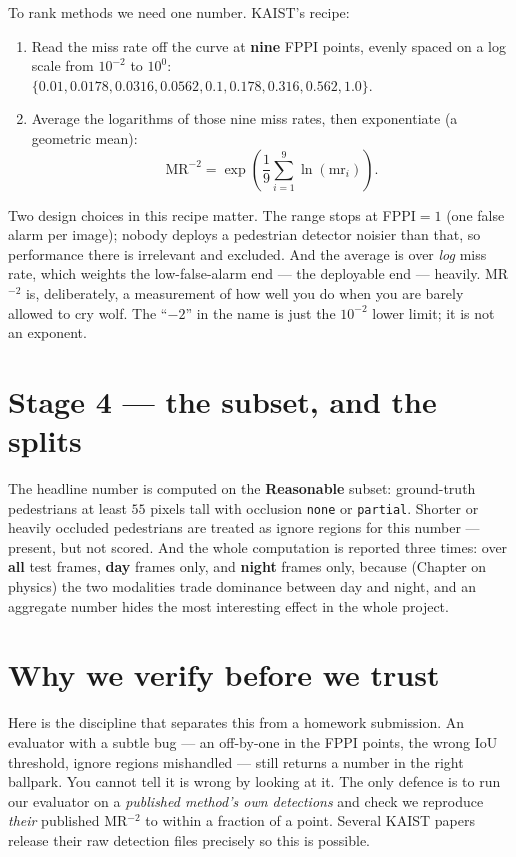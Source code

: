\documentclass[../main.tex]{subfiles}
\begin{document}
To rank methods we need one number. KAIST's recipe:
\begin{enumerate}
  \item Read the miss rate off the curve at \textbf{nine} FPPI points, evenly spaced on a log
        scale from $10^{-2}$ to $10^{0}$:
        $\{0.01, 0.0178, 0.0316, 0.0562, 0.1, 0.178, 0.316, 0.562, 1.0\}$.
  \item Average the logarithms of those nine miss rates, then exponentiate (a geometric mean):
        \[
          \mathrm{MR}^{-2} = \exp\!\left(\frac{1}{9}\sum_{i=1}^{9} \ln(\text{mr}_i)\right).
        \]
\end{enumerate}
Two design choices in this recipe matter. The range stops at FPPI${}=1$ (one false alarm per
image); nobody deploys a pedestrian detector noisier than that, so performance there is
irrelevant and excluded. And the average is over \emph{log} miss rate, which weights the
low-false-alarm end --- the deployable end --- heavily. MR$^{-2}$ is, deliberately, a measurement of
how well you do when you are barely allowed to cry wolf. The ``$-2$'' in the name is just the
$10^{-2}$ lower limit; it is not an exponent.

\section{Stage 4 --- the subset, and the splits}

The headline number is computed on the \textbf{Reasonable} subset: ground-truth pedestrians at
least $55$ pixels tall with occlusion \texttt{none} or \texttt{partial}. Shorter or heavily
occluded pedestrians are treated as ignore regions for this number --- present, but not scored. And
the whole computation is reported three times: over \textbf{all} test frames, \textbf{day} frames
only, and \textbf{night} frames only, because (Chapter on physics) the two modalities trade
dominance between day and night, and an aggregate number hides the most interesting effect in the
whole project.

\section{Why we verify before we trust}

Here is the discipline that separates this from a homework submission. An evaluator with a subtle
bug --- an off-by-one in the FPPI points, the wrong IoU threshold, ignore regions mishandled ---
still returns a number in the right ballpark. You cannot tell it is wrong by looking at it. The
only defence is to run our evaluator on a \emph{published method's own detections} and check we
reproduce \emph{their} published MR$^{-2}$ to within a fraction of a point. Several KAIST papers
release their raw detection files precisely so this is possible.
\end{document}
